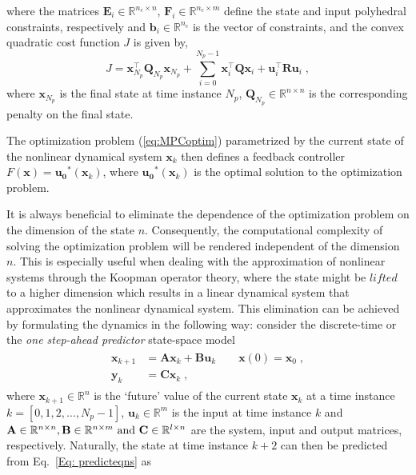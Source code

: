 where the matrices $\mathbf{E}_{i} \in \mathbb{R}^{n_c \times n}$, $\mathbf{F}_{i} \in \mathbb{R}^{n_c \times m}$ define the state and input polyhedral constraints, respectively and $\mathbf{b}_{i} \in \mathbb{R}^{n_c}$ is the vector of constraints, and the convex quadratic cost function $J$ is given by,
\begin{equation}
\label{eq:MPCcostfunction}
    J = \mathbf{x}_{N_p}^\top \mathbf{Q}_{N_p} \mathbf{x}_{N_p} + \sum_{i=0}^{N_p-1} \mathbf{x}_{i}^\top \mathbf{Q} \mathbf{x}_{i} + \mathbf{u}_{i}^\top \mathbf{R}\mathbf{u}_{i} \;,
\end{equation}
% 
where $\mathbf{x}_{N_p}$ is the final state at time instance $N_p$, $\mathbf{Q}_{N_p} \in \mathbb{R}^{n \times n}$ is the corresponding penalty on the final state.
\par 
The optimization problem (\ref{eq:MPCoptim}) parametrized by the current state of the nonlinear dynamical system $\mathbf{x}_k$ then defines a feedback controller $F\mathbf{(x)} = \mathbf{u_0}^\ast(\mathbf{x}_k)$, where $\mathbf{u_0}^\ast(\mathbf{x}_k)$ is the optimal solution to the optimization problem.\par
It is always beneficial to eliminate the dependence of the optimization problem on the dimension of the state $n$. Consequently, the computational complexity of solving the optimization problem will be rendered independent of the dimension $n$. This is especially useful when dealing with the approximation of nonlinear systems through the Koopman operator theory, where the state might be $\textit{lifted}$ to a higher dimension which results in a linear dynamical system that approximates the nonlinear dynamical system. This elimination can be achieved by formulating the dynamics in the following way: consider the discrete-time or the \textit{one step-ahead predictor} state-space model
\begin{align}
\label{Eq: predicteqns}
\begin{split}
    \mathbf{x}_{k+1} &= \mathbf{Ax}_k + \mathbf{B}\mathbf{u}_k \quad \quad \mathbf{x}(0) = \mathbf{x}_0\;, \\
    \mathbf{y}_k &= \mathbf{C}\mathbf{x}_k \;,
\end{split}
\end{align}
where $\mathbf{x}_{k+1} \in \mathbb{R}^{n}$ is the `future' value of the current state $\mathbf{x}_k$ at a time instance $k = [0,1,2,\dots,N_p-1]$, $\mathbf{u}_k \in \mathbb{R}^m$ is the input at time instance $k$ and $\mathbf{A} \in \mathbb{R}^{n\times n},\mathbf{B} \in \mathbb{R}^{n \times m} ~ \textup{and}~ \mathbf{C} \in \mathbb{R}^{l \times n} $ are the system, input and output matrices, respectively. Naturally, the state at time instance $k+2$ can then be predicted from Eq.~\ref{Eq: predicteqns} as
